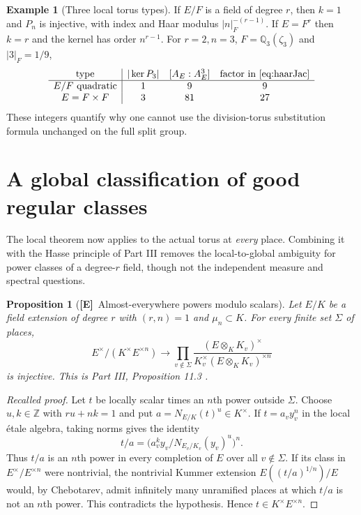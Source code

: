 \documentclass[11pt]{article}
\newcommand{\Z}{\mathbb Z}
\newcommand{\Etag}{\textnormal{\textbf{[E]}}}
\theoremstyle{plain}
\newtheorem{proposition}[theorem]{Proposition}
\theoremstyle{definition}
\newtheorem{example}[theorem]{Example}
\begin{document}
\begin{example}[Three local torus types]
If $E/F$ is a field of degree $r$, then $k=1$ and $P_n$ is
injective, with index and Haar modulus $|n|_F^{-(r-1)}$.
If $E=F^r$ then $k=r$ and the kernel has order $n^{r-1}$.
For $r=2,n=3$, $F=\mathbb Q_3(\zeta_3)$ and $|3|_F=1/9$,
\[
\begin{array}{c|ccc}
\text{type}&|\ker P_3|&[A_E:A_E^3]&\text{factor in \eqref{eq:haarJac}}\\\hline
E/F\text{ quadratic}&1&9&9\\
E=F\times F&3&81&27
\end{array}
\]
These integers quantify why one cannot use the division-torus
substitution formula unchanged on the full split group.
\end{example}

\section{A global classification of good regular classes}\label{sec:globalgood}
The local theorem now applies to the actual torus at \emph{every}
place.  Combining it with the Hasse principle of Part III removes
the local-to-global ambiguity for power classes of a degree-$r$
field, though not the independent measure and spectral questions.

\begin{proposition}[\Etag\ Almost-everywhere powers modulo scalars]\label{prop:Hasse}
Let $E/K$ be a field extension of degree $r$ with $(r,n)=1$ and
$\mu_n\subset K$.  For every finite set $\Sigma$ of places,
\begin{equation}\label{eq:Hasse}
 E^\times/(K^\times E^{\times n})\longrightarrow
 \prod_{v\notin\Sigma}
 \frac{(E\otimes_K K_v)^\times}
 {K_v^\times(E\otimes_KK_v)^{\times n}}
\end{equation}
is injective.  This is Part III, Proposition 11.3 \cite{JoynerIII}.
\end{proposition}
\begin{proof}[Recalled proof]
Let $t$ be locally scalar times an $n$th power outside $\Sigma$.
Choose $u,k\in\Z$ with $ru+nk=1$ and put
$a=N_{E/K}(t)^u\in K^\times$.  If $t=a_v y_v^n$ in the local
\'etale algebra, taking norms gives the identity
\[
 t/a=\bigl(a_v^k y_v/N_{E_v/K_v}(y_v)^u\bigr)^n.
\]
Thus $t/a$ is an $n$th power in every completion of $E$ over all
$v\notin\Sigma$.  If its class in $E^\times/E^{\times n}$ were
nontrivial, the nontrivial Kummer extension
$E((t/a)^{1/n})/E$ would, by Chebotarev, admit infinitely many
unramified places at which $t/a$ is not an $n$th power.
This contradicts the hypothesis.  Hence $t\in K^\times E^{\times n}$.
\end{proof}
\end{document}
